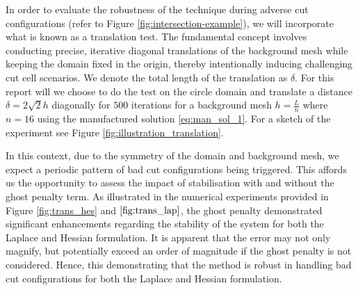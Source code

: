 In order to evaluate the robustness of the technique during adverse cut configurations (refer to Figure \ref{fig:intersection-example}), we will incorporate what is known as a translation test. The fundamental concept involves conducting precise,
iterative diagonal translations of the background mesh while keeping the domain fixed in the origin, thereby intentionally inducing challenging cut cell scenarios. We denote the total length of the translation as $ \delta$. For this report will we
choose to do the test on the circle domain and translate a distance $\delta = 2\sqrt{2}h  $ diagonally for $500$ iterations for a background mesh $h = \frac{L}{n}$ where $n=16$ using the manufactured solution \eqref{eq:man_sol_1}. For a sketch of the experiment see Figure \ref{fig:illustration_translation}.

In this context, due to the symmetry of the domain and background mesh, we expect a periodic pattern of bad cut configurations being triggered. This affords us the opportunity to assess the impact of stabilisation with and without the ghost penalty
term. As illustrated in the numerical experiments provided in Figure \ref{fig:trans_hes} and $\ref{fig:trans_lap} $, the ghost penalty demonstrated significant enhancements regarding the stability of the system for both the Laplace and Hessian
formulation. It is apparent that the error may not only magnify, but potentially exceed an order of magnitude if the ghost penalty is not considered. Hence, this demonstrating that the method is robust in handling bad cut configurations for both the Laplace and Hessian formulation.



